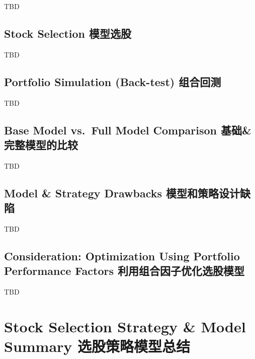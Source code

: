 \documentclass[
]{book}
\begin{document}
TBD

\hypertarget{stock-selection-ux6a21ux578bux9009ux80a1}{%
\section{Stock Selection
模型选股}\label{stock-selection-ux6a21ux578bux9009ux80a1}}

TBD

\hypertarget{portfolio-simulation-back-test-ux7ec4ux5408ux56deux6d4b}{%
\section{Portfolio Simulation (Back-test)
组合回测}\label{portfolio-simulation-back-test-ux7ec4ux5408ux56deux6d4b}}

TBD

\hypertarget{base-model-vs.-full-model-comparison-ux57faux7840ux5b8cux6574ux6a21ux578bux7684ux6bd4ux8f83}{%
\section{Base Model vs.~Full Model Comparison
基础\&完整模型的比较}\label{base-model-vs.-full-model-comparison-ux57faux7840ux5b8cux6574ux6a21ux578bux7684ux6bd4ux8f83}}

TBD

\hypertarget{model-strategy-drawbacks-ux6a21ux578bux548cux7b56ux7565ux8bbeux8ba1ux7f3aux9677}{%
\section{Model \& Strategy Drawbacks
模型和策略设计缺陷}\label{model-strategy-drawbacks-ux6a21ux578bux548cux7b56ux7565ux8bbeux8ba1ux7f3aux9677}}

TBD

\hypertarget{consideration-optimization-using-portfolio-performance-factors-ux5229ux7528ux7ec4ux5408ux56e0ux5b50ux4f18ux5316ux9009ux80a1ux6a21ux578b}{%
\section{Consideration: Optimization Using Portfolio Performance Factors
利用组合因子优化选股模型}\label{consideration-optimization-using-portfolio-performance-factors-ux5229ux7528ux7ec4ux5408ux56e0ux5b50ux4f18ux5316ux9009ux80a1ux6a21ux578b}}

TBD

\hypertarget{stock-selection-strategy-model-summary-ux9009ux80a1ux7b56ux7565ux6a21ux578bux603bux7ed3}{%
\chapter{Stock Selection Strategy \& Model Summary
选股策略模型总结}\label{stock-selection-strategy-model-summary-ux9009ux80a1ux7b56ux7565ux6a21ux578bux603bux7ed3}}
\end{document}
